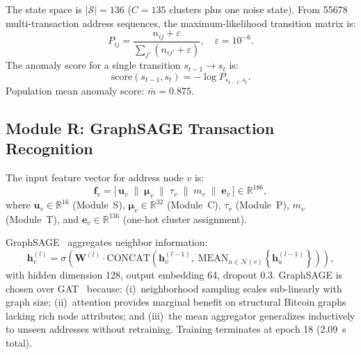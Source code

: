 \documentclass[journal]{IEEEtran}
\begin{document}
The state space is $|\mathcal{S}| = 136$ ($C = 135$ clusters plus one noise
state).  From \num{55678} multi-transaction address sequences, the maximum-likelihood
transition matrix is:
\begin{equation}
  P_{ij} = \frac{n_{ij} + \varepsilon}{\sum_{j'} (n_{ij'} + \varepsilon)},
  \quad \varepsilon = 10^{-6}.
  \label{eq:markov_transition}
\end{equation}
The anomaly score for a single transition $s_{t-1} \to s_t$ is:
\begin{equation}
  \mathrm{score}(s_{t-1}, s_t) = -\log P_{s_{t-1}, s_t}.
  \label{eq:markov_score_t}
\end{equation}
Population mean anomaly score: $\bar{m} = 0.875$.

\subsection{Module R: GraphSAGE Transaction Recognition}
\label{sec:module_r}

The input feature vector for address node $v$ is:
\begin{equation}
  \mathbf{f}_v =
    \bigl[\,
      \mathbf{u}_v \;\|\;
      \boldsymbol{\mu}_v \;\|\;
      \tau_v \;\|\;
      m_v \;\|\;
      \mathbf{e}_v
    \,\bigr]
    \in \mathbb{R}^{186},
  \label{eq:feat_concat}
\end{equation}
where $\mathbf{u}_v \in \mathbb{R}^{16}$ (Module~S),
$\boldsymbol{\mu}_v \in \mathbb{R}^{32}$ (Module~C),
$\tau_v$ (Module~P), $m_v$ (Module~T), and
$\mathbf{e}_v \in \mathbb{R}^{136}$ (one-hot cluster assignment).

GraphSAGE~\cite{Hamilton2017} aggregates neighbor information:
\begin{equation}
  \mathbf{h}_v^{(l)}
    = \sigma\!\left(
        \mathbf{W}^{(l)}
        \cdot
        \mathrm{CONCAT}\!\left(
          \mathbf{h}_v^{(l-1)},\;
          \mathrm{MEAN}_{u \in \mathcal{N}(v)}\!\left\{
            \mathbf{h}_u^{(l-1)}
          \right\}
        \right)
      \right),
  \label{eq:graphsage_r}
\end{equation}
with hidden dimension 128, output embedding 64, dropout $0.3$.
GraphSAGE is chosen over GAT~\cite{Velickovic2018} because: (i)~neighborhood
sampling scales sub-linearly with graph size; (ii)~attention provides marginal
benefit on structural Bitcoin graphs lacking rich node attributes; and
(iii)~the mean aggregator generalizes inductively to unseen addresses without
retraining.
Training terminates at epoch 18 (\SI{2.09}{\second} total).
\end{document}
